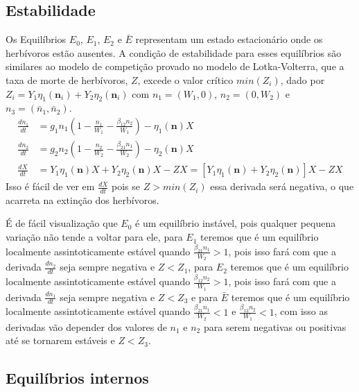 \documentclass{article}
\begin{document}
\subsection{Estabilidade}

Os Equilíbrios $E_0$, $E_1$, $E_2$ e $\bar{E}$ representam um estado estacionário onde os herbívoros estão ausentes. A condição de estabilidade para esses equilíbrios são similares ao modelo de competição provado no modelo de Lotka-Volterra, que a taxa de morte de herbívoros, $Z$, excede o valor crítico $min(Z_i)$, dado por $Z_i=Y_1\eta_1(\textbf{n}_i)+Y_2\eta_2(\textbf{n}_i)$ com $n_1=(W_1,0)$, $n_2=(0,W_2)$ e $n_3=(\bar{n}_1,\bar{n}_2)$.\\
\begin{equation*}
\begin{aligned}
    \frac{dn_1}{dt} &= g_1 n_1 \left( 1 - \frac{n_1}{W_1} - \frac{\beta_{12}n_2}{W_1} \right) - \eta_1(\textbf{n})X\\
    \frac{dn_2}{dt} &= g_2 n_2 \left( 1 - \frac{n_2}{W_2} - \frac{\beta_{21}n_1}{W_2} \right) - \eta_2(\textbf{n})X\\
    \frac{dX}{dt}   &= Y_1\eta_1(\textbf{n})X+Y_2\eta_2(\textbf{n})X-ZX=[Y_1\eta_1(\textbf{n})+Y_2\eta_2(\textbf{n})]X-ZX
\end{aligned}
\end{equation*}
Isso é fácil de ver em $\frac{dX}{dt}$ pois se $Z>min(Z_i)$ essa derivada será negativa, o que acarreta na extinção dos herbívoros.

É de fácil visualização que $E_0$ é um equilíbrio instável, pois qualquer pequena variação não tende a voltar para ele, para $E_1$ teremos que é um equilíbrio localmente assintoticamente estável quando $\frac{\beta_{21}n_1}{W_2} > 1$, pois isso fará com que a derivada $\frac{dn_2}{dt}$ seja sempre negativa e $Z<Z_1$, para $E_2$ teremos que é um equilíbrio localmente assintoticamente estável quando $\frac{\beta_{12}n_2}{W_1} > 1$, pois isso fará com que a derivada $\frac{dn_1}{dt}$ seja sempre negativa e $Z<Z_3$ e para $\bar{E}$ teremos que é um equilíbrio localmente assintoticamente estável quando $\frac{\beta_{21}n_1}{W_2} < 1$ e $\frac{\beta_{12}n_2}{W_1} < 1$, com isso as derivadas vão depender dos valores de $n_1$ e $n_2$ para serem negativas ou positivas até se tornarem estáveis e $Z<Z_3$.

\subsection{Equilíbrios internos}
\end{document}
